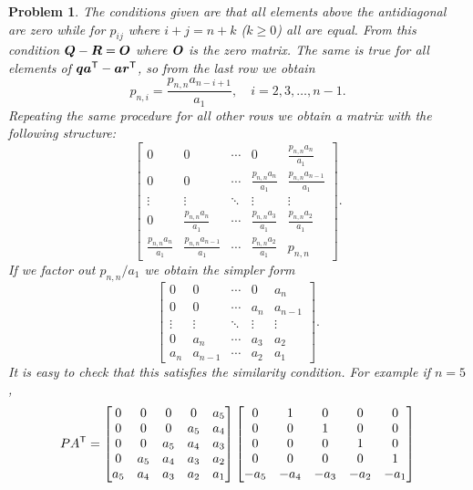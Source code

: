 \documentclass{article}
\theoremstyle{pprop}
\newtheorem{problem}{Problem}[section]
\begin{document}
\begin{problem}
The conditions given are that all elements above the antidiagonal are zero while for $p_{ij}$ where $i+j=n+k$ ($k\geq 0$) all are equal. 
From this condition $\vb*{Q}-\vb*{R}=\vb*{O}$ where $\vb*{O}$ is the zero matrix. The same is true for all elements of  
$\vb*{q} \vb*{a}^{\sf T}-\vb*{a} \vb*{r}^{\sf T}$, so from the last row we obtain
$$
p_{n,i}=\frac{p_{n,n}a_{n-i+1}}{a_1}, \quad i=2,3,\ldots,n-1.
$$
Repeating the same procedure for all other rows we obtain a matrix with the following structure:
$$
\begin{bmatrix}
0 & 0 & \cdots & 0 & \frac{p_{n,n}a_n}{a_1}\\
0 & 0 & \cdots & \frac{p_{n,n}a_n}{a_1} & \frac{p_{n,n}a_{n-1}}{a_1}\\
\vdots & \vdots & \ddots & \vdots & \vdots \\
0 & \frac{p_{n,n}a_n}{a_1} & \cdots & \frac{p_{n,n}a_3}{a_1} & \frac{p_{n,n}a_2}{a_1}\\
 \frac{p_{n,n}a_n}{a_1} &  \frac{p_{n,n}a_{n-1}}{a_1}& \cdots & \frac{p_{n,n}a_2}{a_1} & p_{n,n}
\end{bmatrix}.
$$
If we factor out $p_{n,n}/a_1$ we obtain the simpler form
$$
\begin{bmatrix}
0 & 0 & \cdots & 0 & a_n\\
0 & 0 & \cdots &a_n & a_{n-1}\\
\vdots & \vdots & \ddots & \vdots & \vdots \\
0 & a_{n} & \cdots & a_3 & a_2\\
a_n &  a_{n-1}& \cdots & a_2& a_1
\end{bmatrix}.
$$
It is easy to check that this satisfies the similarity condition. For example if $n=5$,
\begin{align*}
 & P A^{\sf T}=\left[\begin{matrix}0 & 0 & 0 & 0 & a_{5}\\0 & 0 & 0 & a_{5} & a_{4}\\0 & 0 & a_{5} & a_{4} & a_{3}\\0 & a_{5} & a_{4} & a_{3} & a_{2}\\a_{5} & a_{4} & a_{3} & a_{2} & a_{1}\end{matrix}\right]
\left[\begin{matrix}0 & 1 & 0 & 0 & 0\\0 & 0 & 1 & 0 & 0\\0 & 0 & 0 & 1 & 0\\0 & 0 & 0 & 0 & 1\\- a_{5} & - a_{4} & - a_{3} & - a_{2} & - a_{1}\end{matrix}\right] \\

\end{align*}
\end{problem}
\end{document}
